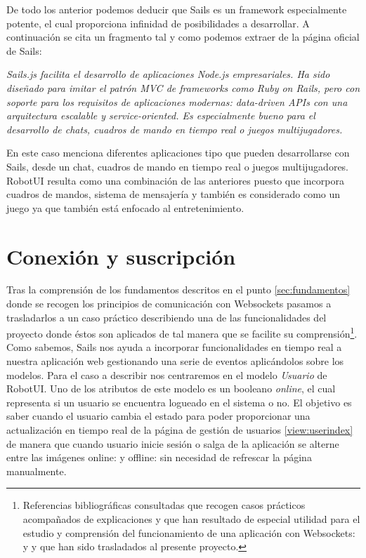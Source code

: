 De todo los anterior podemos deducir que Sails es un framework especialmente potente, el cual proporciona infinidad de posibilidades a desarrollar. A continuación se cita un fragmento tal y 
como podemos extraer de la página oficial de Sails:\\

\begin{center}
\emph{Sails.js facilita el desarrollo de aplicaciones Node.js empresariales. Ha sido diseñado para imitar el patrón MVC de frameworks como Ruby on Rails, pero con soporte para los requisitos de aplicaciones modernas: data-driven APIs con una arquitectura escalable y service-oriented. Es especialmente bueno para el desarrollo de chats, cuadros de mando en tiempo real o juegos
multijugadores.} 
\end{center}


En este caso menciona diferentes aplicaciones tipo que pueden desarrollarse con Sails, desde un chat, cuadros de mando en tiempo real o juegos multijugadores. RobotUI resulta como una combinación de las 
anteriores puesto que incorpora cuadros de mandos, sistema de mensajería y también es considerado como un juego ya que también está enfocado al entretenimiento.\\


\section{ Conexión y suscripción }
\label{sec:comunicaciones-robotui}

Tras la comprensión de los fundamentos descritos en el punto \ref{sec:fundamentos} donde se recogen los principios de comunicación con Websockets pasamos
a trasladarlos a un caso práctico describiendo una de las funcionalidades del proyecto donde éstos son aplicados de tal manera que se facilite su comprensión\footnote{ Referencias bibliográficas 
consultadas que recogen casos prácticos acompañados de explicaciones y que han resultado de especial utilidad para el estudio y comprensión del funcionamiento
de una aplicación con Websockets: \cite{book:socketio} y \cite{website:2} y que han sido trasladados al presente proyecto. }.\\

Como sabemos, Sails nos ayuda a incorporar funcionalidades en tiempo real a nuestra aplicación web gestionando una serie de eventos aplicándolos sobre los modelos. Para el caso a describir nos
centraremos en el modelo \emph{Usuario} de RobotUI. Uno de los atributos de este modelo es un booleano \emph{online}, el cual representa si un usuario se encuentra logueado en el sistema o no.
El objetivo es saber cuando el usuario cambia el estado para poder proporcionar una actualización en tiempo real de la página de gestión de usuarios \ref{view:userindex} de manera que cuando usuario
inicie sesión o salga de la aplicación se alterne entre las imágenes online:  y offline:  sin necesidad de refrescar la página manualmente.\\

